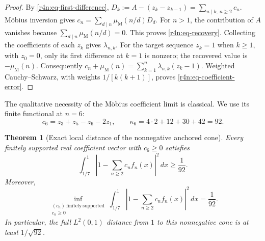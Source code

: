 \documentclass[11pt,a4paper]{article}
\newtheorem{theorem}{Theorem}[section]
\theoremstyle{definition}\newtheorem{definition}[theorem]{Definition}
\theoremstyle{remark}\newtheorem{remark}[theorem]{Remark}
\numberwithin{equation}{section}
\begin{document}
\begin{proof}
By \eqref{r4n:eq-first-difference},
$D_k:=A-(z_k-z_{k-1})=\sum_{n\mid k,\ n\ge2}c_n$.
M\"obius inversion gives
$c_n=\sum_{d\mid n}\mu_{\mathrm M}(n/d)D_d$.
For $n>1$, the contribution of $A$ vanishes because
$\sum_{d\mid n}\mu_{\mathrm M}(n/d)=0$.
This proves \eqref{r4n:eq-recovery}.
Collecting the coefficients of each $z_k$ gives $\lambda_{n,k}$.
For the target sequence $z_k=1$ when $k\ge1$, with $z_0=0$,
only its first difference at $k=1$ is nonzero; the recovered value
is $-\mu_{\mathrm M}(n)$.
Consequently
$c_n+\mu_{\mathrm M}(n)=\sum_{k=1}^n\lambda_{n,k}(z_k-1)$.
Weighted Cauchy--Schwarz, with weights $1/[k(k+1)]$, proves
\eqref{r4n:eq-coefficient-error}.
\end{proof}

The qualitative necessity of the M\"obius coefficient limit is
classical.  We use its finite functional at $n=6$:
\begin{equation}
\label{r4n:eq-six-functional}
 c_6=z_3+z_5-z_6-2z_1,\qquad
 \kappa_6=4\cdot2+12+30+42=92.
\end{equation}

\begin{theorem}[Exact local distance of the nonnegative anchored cone]
\label{r4n:thm-positive-cone}
Every finitely supported real coefficient vector with $c_6\ge0$
satisfies
\begin{equation}
\label{r4n:eq-six-lower}
 \int_{1/7}^{1}
       \left|1-\sum_{n\ge2}c_nf_n(x)\right|^2\,dx\ge\frac1{92}.
\end{equation}
Moreover,
\begin{equation}
\label{r4n:eq-six-sharp}
 \inf_{\substack{(c_n)\ \mathrm{finitely\ supported}\\c_n\ge0}}
 \int_{1/7}^{1}
       \left|1-\sum_{n\ge2}c_nf_n(x)\right|^2\,dx=\frac1{92}.
\end{equation}
In particular, the full $L^2(0,1)$ distance from $1$ to this
nonnegative cone is at least $1/\sqrt{92}$.
\end{theorem}
\end{document}
